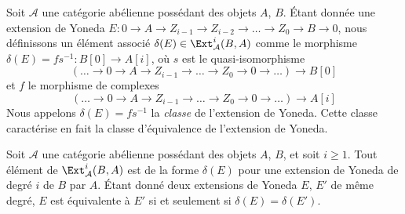 \medskip\noindent
Soit $\mathcal{A}$ une catégorie abélienne possédant des objets $A$, $B$.
Étant donnée une extension de Yoneda
$E : 0 \to A \to Z_{i - 1} \to Z_{i - 2} \to \ldots \to Z_0 \to B \to 0$,
nous définissons un élément associé
$\delta(E) \in \Ext^i_\mathcal{A}(B, A)$ comme le morphisme
$\delta(E) = fs^{-1} : B[0] \to A[i]$, où $s$ est le quasi-isomorphisme
$$
(\ldots \to 0 \to A \to Z_{i - 1} \to \ldots \to Z_0 \to 0 \to \ldots)
\longrightarrow
B[0]
$$
et $f$ le morphisme de complexes
$$
(\ldots \to 0 \to A \to Z_{i - 1} \to \ldots \to Z_0 \to 0 \to \ldots)
\longrightarrow
A[i]
$$
Nous appelons $\delta(E) = fs^{-1}$ la {\it classe} de l'extension de Yoneda.
Cette classe caractérise en fait la classe d'équivalence de l'extension de
Yoneda.

\begin{lemma}
\label{lemma-yoneda-extension}
Soit $\mathcal{A}$ une catégorie abélienne possédant des objets $A$, $B$, et
soit $i \geq 1$.
Tout élément de $\Ext^i_\mathcal{A}(B, A)$ est de la forme $\delta(E)$ pour
une extension de Yoneda de degré $i$ de $B$ par $A$.
Étant donné deux extensions de Yoneda $E$, $E'$ de même degré, $E$ est
équivalente à $E'$ si et seulement si $\delta(E) = \delta(E')$.
\end{lemma}

